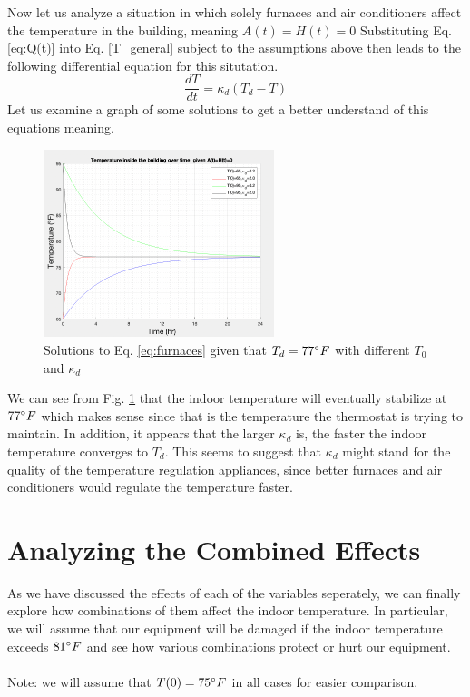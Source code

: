 \documentclass[titlepage]{article}
\begin{document}
Now let us analyze a situation in which solely furnaces and air conditioners affect the temperature in the building, meaning $A(t)=H(t)=0$
Substituting Eq. \ref{eq:Q(t)} into Eq. \ref{T_general} subject to the assumptions above then leads to the following differential equation for this situtation.
\begin{equation} \label{eq:furnaces}
    \frac{dT}{dt} = \kappa_d(T_d-T)
\end{equation}
Let us examine a graph of some solutions to get a better understand of this equations meaning.
\begin{figure}[H]
    \centering
    \includegraphics[width=0.6\textwidth]{./images/furnaces.png}
    \caption{Solutions to Eq. \eqref{eq:furnaces} given that $T_d=77\degree F$ with different $T_0$ and $\kappa_d$}
    \label{fig:furnaces}
\end{figure}
We can see from Fig. \ref{fig:furnaces} that the indoor temperature will eventually stabilize at $77\degree F$ which makes
sense since that is the temperature the thermostat is trying to maintain. In addition, it appears that the larger $\kappa_d$ is,
the faster the indoor temperature converges to $T_d$. This seems to suggest that $\kappa_d$ 
might stand for the quality of the temperature regulation appliances, since better furnaces and air conditioners
would regulate the temperature faster.



\section{Analyzing the Combined Effects}
As we have discussed the effects of each of the variables seperately, we can finally
explore how combinations of them affect the indoor temperature. In particular, 
we will assume that our equipment will be damaged if the indoor temperature
exceeds $81\degree F$ and see how various combinations protect or hurt our equipment. \\ \\
Note: we will assume that $T(0)=75\degree F$ in all cases for easier comparison.
\end{document}
